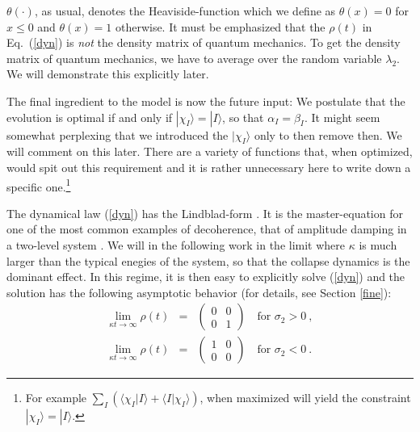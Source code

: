 \documentclass[11pt,twoside,A4]{article}
\def\beqn{\begin{eqnarray}}
\def\eeqn{\end{eqnarray}}
\begin{document}
$\theta(\cdot)$, as usual, denotes the Heaviside-function which we define as $\theta(x) = 0$ for $x \leq 0$ and $\theta(x) =1$ otherwise.
It must be emphasized that the $\rho(t)$ in Eq.\ (\ref{dyn}) is {\it not} the density matrix of quantum mechanics. To get the density matrix of quantum mechanics, we have to average over the random variable $\lambda_2$. We will demonstrate this explicitly later. 

The final ingredient to the model is now the future input: We postulate that the evolution is optimal if and only if $|\chi_I \rangle = |I \rangle$, so that $\alpha_I = \beta_I$. It might seem somewhat perplexing that we introduced the $|\chi_I \rangle$ only to then remove then. We will comment on this later. There are a variety of functions that, when optimized, would spit out this requirement and it is rather unnecessary here to write down a specific one.\footnote{For example $\sum_I (\langle \chi_I|I\rangle + \langle I | \chi_I\rangle)$, when maximized will yield the constraint $|\chi_I\rangle = |I\rangle$. } 

The dynamical law (\ref{dyn}) has the Lindblad-form \cite{Lindblad,Gorini}. It is the master-equation for one of the most common examples of decoherence, that of amplitude damping in a two-level system \cite{Nielsen}. We will in the following work in the limit where $\kappa$ is much larger than the typical enegies of the system, so that the collapse dynamics is the dominant effect. In this regime, it is then easy to explicitly solve (\ref{dyn}) and the solution has the following asymptotic behavior (for details, see Section \ref{fine}):
\beqn
\lim_{\kappa t \to \infty} \rho (t) &=& \begin{pmatrix}
0 & 0 \\
0 & 1
\end{pmatrix} \quad \mbox{for $\sigma_2 > 0$}~, \\
\lim_{\kappa t \to \infty} \rho (t) &=& \begin{pmatrix}
1 & 0 \\
0 & 0
\end{pmatrix} \quad \mbox{for $\sigma_2 < 0$}~. \label{limits2}
\eeqn
\end{document}
